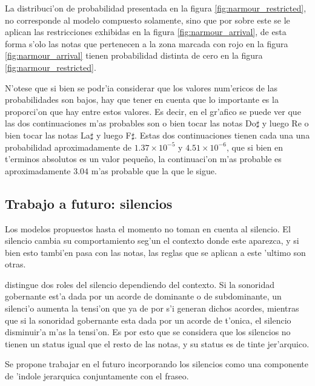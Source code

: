 La distribuci'on de probabilidad presentada en la figura \ref{fig:narmour_restricted}, no corresponde al modelo compuesto solamente, sino 
que por sobre este se le aplican las restricciones exhibidas en la figura \ref{fig:narmour_arrival}, de esta forma s'olo las notas que 
pertenecen a la zona marcada con rojo en la figura \ref{fig:narmour_arrival} tienen probabilidad distinta de cero en la figura \ref{fig:narmour_restricted}.

N'otese que si bien se podr'ia considerar que los valores num'ericos de las probabilidades son bajos, hay que tener en cuenta que lo 
importante es la proporci'on que hay entre estos valores. Es decir, en el gr'afico se puede ver que las dos continuaciones m'as 
probables son o bien tocar las notas Do$\sharp$ y luego Re o bien tocar las notas La$\sharp$ y luego F$\sharp$. Estas dos continuaciones 
tienen cada una una probabilidad aproximadamente de $1.37\times10^{-5}$ y $4.51\times10^{-6}$, que si bien en t'erminos absolutos es 
un valor pequeño, la continuaci'on m'as probable es aproximadamente $3.04$ m'as probable que la que le sigue. 

\subsection{Trabajo a futuro: silencios}
Los modelos propuestos hasta el momento no toman en cuenta al silencio. 
El silencio cambia su comportamiento seg'un el contexto donde este aparezca, y si bien esto tambi'en pasa con las notas, las reglas que se
aplican a este 'ultimo son otras. 

\cite{Margulis08} distingue dos roles del silencio dependiendo del contexto. Si la sonoridad gobernante est'a dada por un acorde de dominante
o de subdominante, un silenci'o aumenta la tensi'on que ya de por s'i generan dichos acordes, mientras que si la sonoridad gobernante
esta dada por un acorde de t'onica, el silencio disminuir'a m'as la tensi'on. Es por esto que se considera que los silencios no tienen 
un status igual que el resto de las notas, y su status es de tinte jer'arquico.

Se propone trabajar en el futuro incorporando los silencios como una componente de 'indole jerarquica conjuntamente con el fraseo.
